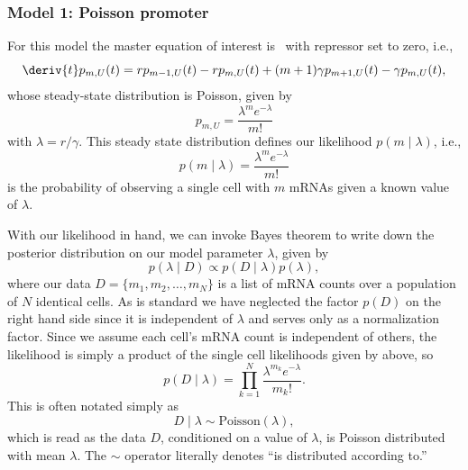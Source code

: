 \subsubsection{Model 1: Poisson promoter}
For this model the master equation of interest is~
with repressor set to zero, i.e.,
\begin{equation}
\deriv{t}p_{m,U}(t) = rp_{m-1,U}(t) - rp_{m,U}(t)
        + (m+1)\gamma p_{m+1,U}(t) - \gamma p_{m,U}(t),
\end{equation}
whose steady-state distribution is Poisson, given by
\begin{equation}
p_{m,U} = \frac{\lambda^m e^{-\lambda}}{m!}
\end{equation}
with $\lambda=r/\gamma$. This steady state distribution defines our likelihood
$p(m\mid\lambda)$, i.e.,
\begin{equation}
p(m\mid\lambda) = \frac{\lambda^m e^{-\lambda}}{m!}
\label{eq:poisson_inference010}
\end{equation}
is the probability of observing a single cell with $m$ mRNAs given a known value
of $\lambda$.

With our likelihood in hand, we can invoke Bayes theorem to write down the
posterior distribution on our model parameter $\lambda$, given by
\begin{equation}
p(\lambda\mid D) \propto p(D\mid\lambda) p(\lambda),
\end{equation}
where our data $D=\{m_1, m_2,\dots, m_N\}$ is a list of mRNA counts over a
population of $N$ identical cells. As is standard we have neglected the factor
$p(D)$ on the right hand side since it is independent of $\lambda$ and serves
only as a normalization factor. Since we assume each cell's mRNA count is
independent of others, the likelihood is simply a product of the single cell
likelihoods given by  above, so
\begin{equation}
p(D\mid\lambda) = \prod_{k=1}^N \frac{\lambda^{m_k}e^{-\lambda}}{m_k!}.
\end{equation}
This is often notated simply as
\begin{equation}
D\mid\lambda \sim \text{Poisson}(\lambda),
\end{equation}
which is read as the data $D$, conditioned on a value of $\lambda$, is Poisson
distributed with mean $\lambda$. The $\sim$ operator literally denotes ``is
distributed according to.''

